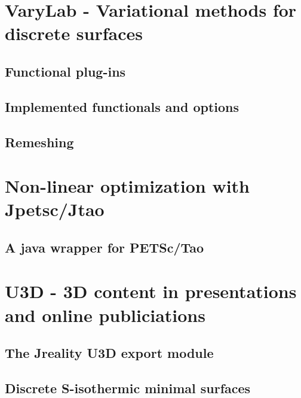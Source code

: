 

\chapter{{\sc VaryLab} - Variational methods for discrete surfaces}
\label{sec:varylab}
\section{Functional plug-ins}
\section{Implemented functionals and options}
\section{Remeshing}



\chapter{Non-linear optimization with {\sc Jpetsc/Jtao}}
\label{sec:jpetsctao}
\section{A java wrapper for {\sc PETSc/Tao}}

\chapter{{\sc U3D} - 3D content in presentations and online publiciations}
\label{sec:u3d}
\section{The {\sc Jreality} U3D export module}
\section{Discrete S-isothermic minimal surfaces}


